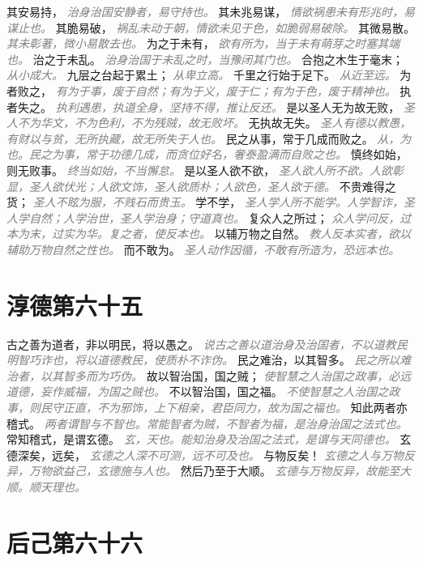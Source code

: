 \documentclass[a4paper,zihao=-4,oneside,landscape,UTF8]{ctexart}
\newcommand{\zhushi}[1]{\scriptsize{\textit{\textcolor{gray}{#1}}}\normalsize}
\begin{document}
其安易持，
\zhushi{治身治国安静者，易守持也。}
其未兆易谋，
\zhushi{情欲祸患未有形兆时，易谋止也。}
其脆易破，
\zhushi{祸乱未动于朝，情欲未见于色，如脆弱易破除。}
其微易散。
\zhushi{其未彰著，微小易散去也。}
为之于未有，
\zhushi{欲有所为，当于未有萌芽之时塞其端也。}
治之于未乱。
\zhushi{治身治国于未乱之时，当豫闭其门也。}
合抱之木生于毫末；
\zhushi{从小成大。}
九层之台起于累土；
\zhushi{从卑立高。}
千里之行始于足下。
\zhushi{从近至远。}
为者败之，
\zhushi{有为于事，废于自然；有为于义，废于仁；有为于色，废于精神也。}
执者失之。
\zhushi{执利遇患，执道全身，坚持不得，推让反还。}
是以圣人无为故无败，
\zhushi{圣人不为华文，不为色利，不为残贼，故无败坏。}
无执故无失。
\zhushi{圣人有德以教愚，有财以与贫，无所执藏，故无所失于人也。}
民之从事，常于几成而败之。
\zhushi{从，为也。民之为事，常于功德几成，而贪位好名，奢泰盈满而自败之也。}
慎终如始，则无败事。
\zhushi{终当如始，不当懈怠。}
是以圣人欲不欲，
\zhushi{圣人欲人所不欲。人欲彰显，圣人欲伏光；人欲文饰，圣人欲质朴；人欲色，圣人欲于德。}
不贵难得之货；
\zhushi{圣人不眩为服，不贱石而贵玉。}
学不学，
\zhushi{圣人学人所不能学。人学智诈，圣人学自然；人学治世，圣人学治身；守道真也。}
复众人之所过；
\zhushi{众人学问反，过本为末，过实为华。复之者，使反本也。}
以辅万物之自然。
\zhushi{教人反本实者，欲以辅助万物自然之性也。}
而不敢为。
\zhushi{圣人动作因循，不敢有所造为，恐远本也。}


\section{淳德第六十五}

古之善为道者，非以明民，将以愚之。
\zhushi{说古之善以道治身及治国者，不以道教民明智巧诈也，将以道德教民，使质朴不诈伪。}
民之难治，以其智多。
\zhushi{民之所以难治者，以其智多而为巧伪。}
故以智治国，国之贼；
\zhushi{使智慧之人治国之政事，必远道德，妄作威福，为国之贼也。}
不以智治国，国之福。
\zhushi{不使智慧之人治国之政事，则民守正直，不为邪饰，上下相亲，君臣同力，故为国之福也。}
知此两者亦稽式。
\zhushi{两者谓智与不智也。常能智者为贼，不智者为福，是治身治国之法式也。}
常知稽式，是谓玄德。
\zhushi{玄，天也。能知治身及治国之法式，是谓与天同德也。}
玄德深矣，远矣，
\zhushi{玄德之人深不可测，远不可及也。}
与物反矣！
\zhushi{玄德之人与万物反异，万物欲益己，玄德施与人也。}
然后乃至于大顺。
\zhushi{玄德与万物反异，故能至大顺。顺天理也。}


\section{后己第六十六}
\end{document}
